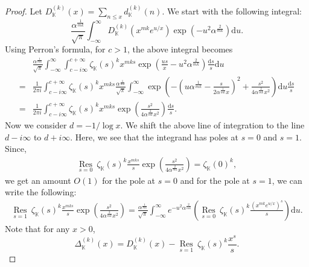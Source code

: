 \documentclass[reqno]{amsart}
\numberwithin{equation}{section}
\theoremstyle{plain}
\begin{document}
\begin{proof}
Let $D_\mathbb{K}^{(k)}(x)= \sum_{n\leq x}d_\mathbb{K}^{(k)}(n)$. We start with the following integral:
\begin{equation*}
	\frac{\alpha^{\frac{1}{mk}}}{\sqrt{\pi}}\int_{-\infty}^{\infty}D_{\mathbb{K}}^{(k)}\left(x^{mk}e^{u/x}\right) \exp\left(-u^2\alpha^{\frac{2}{mk}}\right)\mathrm{d}u.
\end{equation*}
Using Perron's formula, for $c>1$, the above integral becomes
\begin{align*}
	&\frac{\alpha^{\frac{1}{mk}}}{\sqrt{\pi}} \int_{-\infty}^{\infty} \int_{c-i\infty}^{c+\infty} \zeta_{\mathbb{K}}(s)^k x^{mks}\exp\left(\frac{us}{x}-u^2\alpha^{\frac{2}{mk}}\right)\frac{\mathrm{d}s}{s}\mathrm{d}u\\
	=& \frac{1}{2\pi i} \int_{c-i\infty}^{c+\infty} \zeta_{\mathbb{K}}(s)^k x^{mks}\frac{\alpha^{\frac{1}{mk}}}{\sqrt{\pi}}\int_{-\infty}^{\infty} \exp\left( - \left(u\alpha^{\frac{1}{mk}}-\frac{s}{2\alpha^{\frac{1}{mk}}x}\right)^2+\frac{s^2}{4\alpha^{\frac{2}{mk}}x^2}\right)\mathrm{d}u\frac{\mathrm{d}s}{s}\\
	=& \frac{1}{2\pi i} \int_{c-i\infty}^{c+\infty} \zeta_{\mathbb{K}}(s)^k x^{mks} \exp\left( \frac{s^2}{4\alpha^{\frac{2}{mk}}x^2}\right) \frac{\mathrm{d}s}{s}.
\end{align*}
Now we consider $d=-1/\log x$. We shift the above line of integration to the line $d-i\infty$ to $d+i\infty$. Here, we see that the integrand has poles at $s=0$ and $s=1$. Since,
\begin{align*}
	\underset{s=0}{\operatorname{Res}} \ \zeta_{\mathbb{K}}(s)^k \frac{x^{mks}}{s} \exp\left( \frac{s^2}{4\alpha^{\frac{2}{mk}}x^2}\right)= \zeta_{\mathbb{K}}(0)^k,
\end{align*}
we get an amount $O(1)$ for the pole at $s=0$ and for the pole at $s=1$, we can write the following:
\begin{align*}
		\underset{s=1}{\operatorname{Res}} \ \zeta_{\mathbb{K}}(s)^k \frac{x^{mks}}{s} \exp\left( \frac{s^2}{4\alpha^{\frac{2}{mk}}x^2}\right) = \frac{\alpha^{\frac{1}{mk}}}{\sqrt{\pi}} \int_{-\infty}^{\infty} e^{-u^2\alpha^{\frac{2}{mk}}} \left(\underset{s=0}{\operatorname{Res}} \ \zeta_{\mathbb{K}}(s)^k \frac{\left(x^{mk}e^{u/x}\right)^s}{s} \right)\mathrm{d}u.
\end{align*}
Note that for any $x>0$,
\begin{equation*}
	\Delta_{\mathbb{K}}^{(k)}(x) = D_\mathbb{K}^{(k)}(x) - \underset{s=1}{\operatorname{Res}} \ \zeta_{\mathbb{K}}(s)^k \frac{x^s}{s}.

\end{equation*}
\end{proof}
\end{document}

